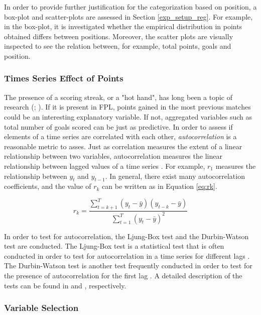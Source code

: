 \newpar

In order to provide further justification for the categorization based on position, a box-plot and scatter-plots are assessed in Section \ref{exp_setup_reg}. For example, in the box-plot, it is investigated whether the empirical distribution in points obtained differs between positions. Moreover, the scatter plots are visually inspected to see the relation between, for example, total points, goals and position.

\subsubsection{Times Series Effect of Points}

The presence of a scoring streak, or a "hot hand", has long been a topic of research (\cite{hot_hand}; \cite{hot_hand_2}). If it is present in FPL, points gained in the most previous matches could be an interesting explanatory variable. If not, aggregated variables such as total number of goals scored can be just as predictive. In order to assess if elements of a time series are correlated with each other, \textit{autocorrelation} is a reasonable metric to asses. Just as correlation measures the extent of a linear relationship between two variables, autocorrelation measures the linear relationship between lagged values of a time series \citep{Hyndman}. For example, $r_1$ measures the relationship between $y_t$ and $y_{t-1}$. In general, there exist many autocorrelation coefficients, and the value of $r_k$ can be written as in Equation \ref{eq:rk}. 


\begin{equation}\label{eq:rk}
    r_k = \frac{\sum_{t=k+1}^T(y_t-\bar{y})(y_{t-k}-\bar{y})}{\sum_{t=1}^T(y_t-\bar{y})^2}
\end{equation}

In order to test for autocorrelation, the Ljung-Box test and the Durbin-Watson test are conducted. The Ljung-Box test is a statistical test that is often conducted in order to test for autocorrelation in a time series for different lags \citep{Hyndman}. The Durbin-Watson test is another test frequently conducted in order to test for the presence of autocorrelation for the first lag \citep{Carol_1}. A detailed description of the tests can be found in \cite{Hyndman} and \cite{Carol_1}, respectively.

\subsubsection{Variable Selection}

